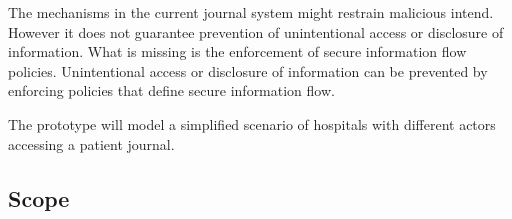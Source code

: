 The mechanisms in the current journal system might restrain malicious intend. However it does not guarantee prevention of unintentional access or disclosure of information\cite{Harman2012}. 
What is missing is the enforcement of secure information flow policies. Unintentional access or disclosure of information can be prevented by enforcing policies that define secure information flow.

The prototype will model a simplified scenario of hospitals with different actors accessing a patient journal. 







\subsection{Scope} 



